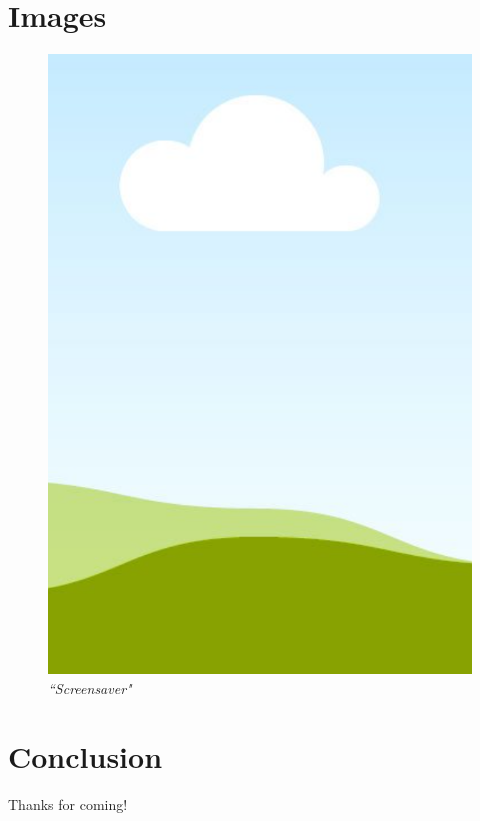 \documentclass{article}
\begin{document}
\section{Images}
\begin{figure}[H]
\centering
\includegraphics[scale=0.5]{images/land.PNG}
\caption{\textit{``Screensaver"}}
\end{figure}

\section{Conclusion}
Thanks for coming!



\end{document}
